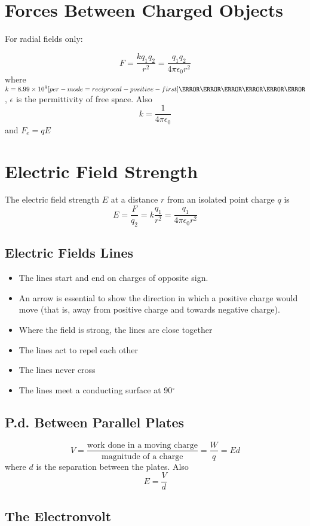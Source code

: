 \documentclass[a4paper,12pt]{article}
\let\oldsi\si
\renewcommand{\si}[1]{\oldsi[per-mode=reciprocal-positive-first]{#1}}
\newcommand{\degsym}{^{\circ}}
\begin{document}
\section{Forces Between Charged Objects}

For radial fields only:

$$F=\frac{kq_1q_2}{r^2} = \frac{q_1q_2}{4\pi\epsilon_0 r^2}$$
where $k=8.99\times 10^9 \si{\N\m\squared\per\C\squared}$, $\epsilon$ is the permittivity of free space.
Also $$k = \frac{1}{4\pi\epsilon_0}$$ and $F_e = qE$

\section{Electric Field Strength}
The electric field strength $E$ at a distance $r$ from an isolated point charge $q$ is $$E=\frac{F}{q_2}=k\frac{q_1}{r^2}=\frac{q_1}{4\pi\epsilon_0 r^2}$$

\subsection{Electric Fields Lines}

\begin{itemize}
  \item The lines start and end on charges of opposite sign.
  \item An arrow is essential to show the direction in which a positive charge would move (that is, away from positive charge and towards negative charge).
  \item Where the field is strong, the lines are close together
  \item The lines act to repel each other
  \item The lines never cross
  \item The lines meet a conducting surface at 90$\degsym$
\end{itemize}

\subsection{P.d. Between Parallel Plates}

$$V = \frac{\text{work done in a moving charge}}{\text{magnitude of a charge}} = \frac{W}{q} = Ed$$
where $d$ is the separation between the plates. Also
$$E = \frac{V}{d}$$

\subsection{The Electronvolt}
\end{document}
